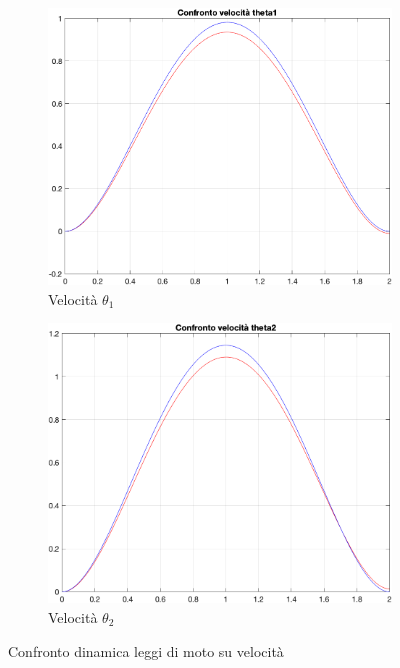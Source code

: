 \begin{figure}[!ht]
\begin{subfigure}{.5\textwidth}
  \centering
  \includegraphics[width=.8\linewidth]{Immagini/confrvelt1.png}  
  \caption{Velocità $\theta_1$}
  \label{fig:sub-firstv}
\end{subfigure}
\begin{subfigure}{.5\textwidth}
  \centering
  \includegraphics[width=.8\linewidth]{Immagini/confrtvelt2.png}  
  \caption{Velocità $\theta_2$}
  \label{fig:sub-secondv}
\end{subfigure}
\caption{Confronto dinamica leggi di moto su velocità}
\end{figure}
